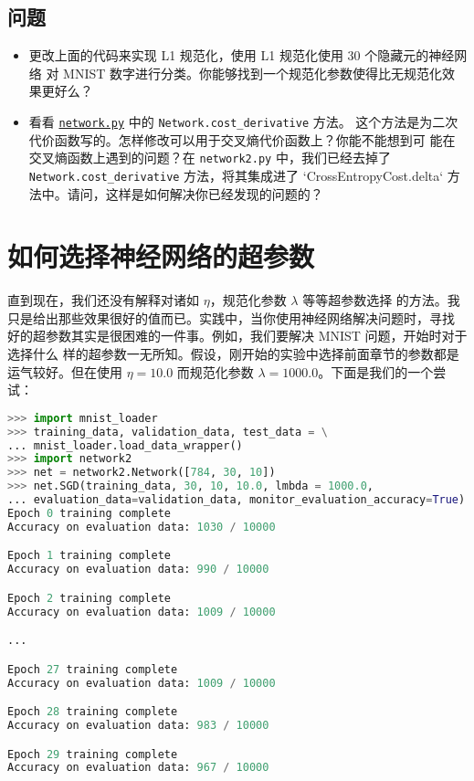 \subsection*{问题}

\begin{itemize}
\item 更改上面的代码来实现 L1 规范化，使用 L1 规范化使用 $30$ 个隐藏元的神经网络
  对 MNIST 数字进行分类。你能够找到一个规范化参数使得比无规范化效果更好么？
\item 看看 \href{https://github.com/mnielsen/neural-networks-and-deep-learning/blob/master/src/network.py}{\lstinline!network.py!} 中的 \lstinline!Network.cost_derivative! 方法。
  这个方法是为二次代价函数写的。怎样修改可以用于交叉熵代价函数上？你能不能想到可
  能在交叉熵函数上遇到的问题？在 \lstinline!network2.py! 中，我们已经去掉了
  \lstinline!Network.cost_derivative! 方法，将其集成进了
  `CrossEntropyCost.delta` 方法中。请问，这样是如何解决你已经发现的问题的？
\end{itemize}

\section{如何选择神经网络的超参数}
\label{sec:how_to_choose_a_neural_network's_hyper-parameters}

直到现在，我们还没有解释对诸如\learningrate{} $\eta$，规范化参数 $\lambda$ 等等超参数选择
的方法。我只是给出那些效果很好的值而已。实践中，当你使用神经网络解决问题时，寻找
好的超参数其实是很困难的一件事。例如，我们要解决 MNIST 问题，开始时对于选择什么
样的超参数一无所知。假设，刚开始的实验中选择前面章节的参数都是运气较好。但在使用
\learningrate{} $\eta=10.0$ 而规范化参数 $\lambda=1000.0$。下面是我们的一个尝试：

\begin{lstlisting}[language=Python]
>>> import mnist_loader
>>> training_data, validation_data, test_data = \
... mnist_loader.load_data_wrapper()
>>> import network2
>>> net = network2.Network([784, 30, 10])
>>> net.SGD(training_data, 30, 10, 10.0, lmbda = 1000.0,
... evaluation_data=validation_data, monitor_evaluation_accuracy=True)
Epoch 0 training complete
Accuracy on evaluation data: 1030 / 10000

Epoch 1 training complete
Accuracy on evaluation data: 990 / 10000

Epoch 2 training complete
Accuracy on evaluation data: 1009 / 10000

...

Epoch 27 training complete
Accuracy on evaluation data: 1009 / 10000

Epoch 28 training complete
Accuracy on evaluation data: 983 / 10000

Epoch 29 training complete
Accuracy on evaluation data: 967 / 10000
\end{lstlisting}


